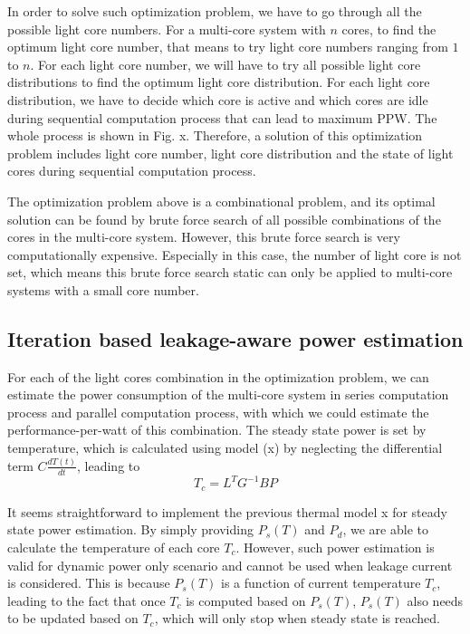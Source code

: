 In order to solve such optimization problem, we have to go through all the possible light core numbers. For a multi-core system with $n$ cores, to find the optimum light core number, that means to try light core numbers ranging from $1$ to $n$. For each light core number, we will have to try all possible light core distributions to find the optimum light core distribution. For each light core distribution, we have to decide which core is active and which cores are idle during sequential computation process that can lead to maximum PPW. The whole process is shown in Fig. x. Therefore, a solution of this optimization problem includes light core number, light core distribution and the state of light cores during sequential computation process. 

The optimization problem above is a combinational problem, and its optimal solution can be found by brute force search of all possible combinations of the cores in the multi-core system. However, this brute force search is very computationally expensive. Especially in this case, the number of light core is not set, which means this brute force search static can only be applied to multi-core systems with a small core number. 

\subsection{Iteration based leakage-aware power estimation}
For each of the light cores combination in the optimization problem, we can estimate the power consumption of the multi-core system in series computation process and parallel computation process, with which we could estimate the performance-per-watt of this combination. The steady state power is set by temperature, which is calculated using model (x) by neglecting the differential term $C\frac{dT(t)}{dt}$, leading to
\begin{equation}\label{steady_state_temperature}
T_{c} = L^{T}G^{-1}BP
\end{equation}

It seems straightforward to implement the previous thermal model x for steady state power estimation. By simply providing $P_s(T)$ and $P_d$, we are able to calculate the temperature of each core $T_{c}$. However, such power estimation is valid for dynamic power only scenario and cannot be used when leakage current is considered. This is because $P_{s}(T)$ is a function of current temperature $T_{c}$, leading to the fact that once $T_{c}$ is computed based on $P_{s}(T)$, $P_{s}(T)$ also needs to be updated based on $T_{c}$, which will only stop when steady state is reached.


